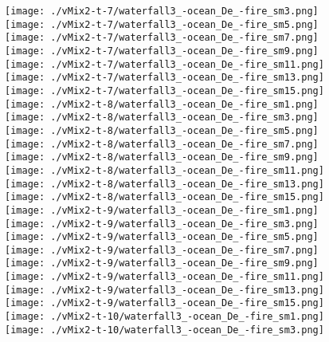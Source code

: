 \begin{figure}[ht!]
{    \texttt{[image: ./vMix2-t-7/waterfall3\_-ocean\_De\_-fire\_sm3.png]}
    \texttt{[image: ./vMix2-t-7/waterfall3\_-ocean\_De\_-fire\_sm5.png]}
    \texttt{[image: ./vMix2-t-7/waterfall3\_-ocean\_De\_-fire\_sm7.png]}
    \texttt{[image: ./vMix2-t-7/waterfall3\_-ocean\_De\_-fire\_sm9.png]}
    \texttt{[image: ./vMix2-t-7/waterfall3\_-ocean\_De\_-fire\_sm11.png]}
    \texttt{[image: ./vMix2-t-7/waterfall3\_-ocean\_De\_-fire\_sm13.png]}
    \texttt{[image: ./vMix2-t-7/waterfall3\_-ocean\_De\_-fire\_sm15.png]} \\
\vspace{1mm}
    \texttt{[image: ./vMix2-t-8/waterfall3\_-ocean\_De\_-fire\_sm1.png]}
    \texttt{[image: ./vMix2-t-8/waterfall3\_-ocean\_De\_-fire\_sm3.png]}
    \texttt{[image: ./vMix2-t-8/waterfall3\_-ocean\_De\_-fire\_sm5.png]}
    \texttt{[image: ./vMix2-t-8/waterfall3\_-ocean\_De\_-fire\_sm7.png]}
    \texttt{[image: ./vMix2-t-8/waterfall3\_-ocean\_De\_-fire\_sm9.png]}
    \texttt{[image: ./vMix2-t-8/waterfall3\_-ocean\_De\_-fire\_sm11.png]}
    \texttt{[image: ./vMix2-t-8/waterfall3\_-ocean\_De\_-fire\_sm13.png]}
    \texttt{[image: ./vMix2-t-8/waterfall3\_-ocean\_De\_-fire\_sm15.png]} \\
\vspace{1mm}
    \texttt{[image: ./vMix2-t-9/waterfall3\_-ocean\_De\_-fire\_sm1.png]}
    \texttt{[image: ./vMix2-t-9/waterfall3\_-ocean\_De\_-fire\_sm3.png]}
    \texttt{[image: ./vMix2-t-9/waterfall3\_-ocean\_De\_-fire\_sm5.png]}
    \texttt{[image: ./vMix2-t-9/waterfall3\_-ocean\_De\_-fire\_sm7.png]}
    \texttt{[image: ./vMix2-t-9/waterfall3\_-ocean\_De\_-fire\_sm9.png]}
    \texttt{[image: ./vMix2-t-9/waterfall3\_-ocean\_De\_-fire\_sm11.png]}
    \texttt{[image: ./vMix2-t-9/waterfall3\_-ocean\_De\_-fire\_sm13.png]}
    \texttt{[image: ./vMix2-t-9/waterfall3\_-ocean\_De\_-fire\_sm15.png]} \\
\vspace{1mm}
    \texttt{[image: ./vMix2-t-10/waterfall3\_-ocean\_De\_-fire\_sm1.png]}
    \texttt{[image: ./vMix2-t-10/waterfall3\_-ocean\_De\_-fire\_sm3.png]}
}
\end{figure}
